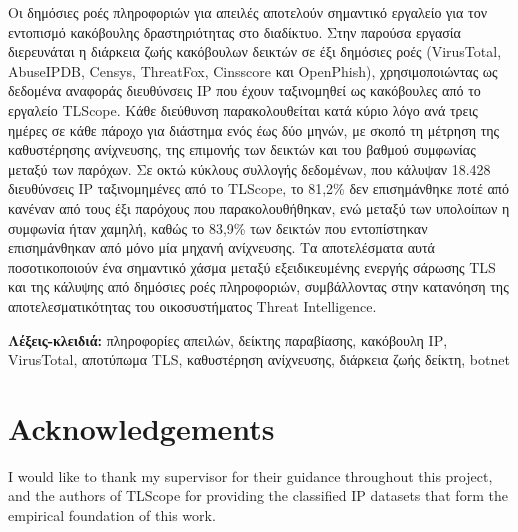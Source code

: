 \documentclass[12pt, a4paper, twoside]{report}
\begin{document}
Οι δημόσιες ροές πληροφοριών για απειλές αποτελούν σημαντικό εργαλείο για τον εντοπισμό
κακόβουλης δραστηριότητας στο διαδίκτυο. Στην παρούσα εργασία διερευνάται η διάρκεια ζωής
κακόβουλων δεικτών σε έξι δημόσιες ροές (\foreignlanguage{english}{VirusTotal},
\foreignlanguage{english}{AbuseIPDB}, \foreignlanguage{english}{Censys},
\foreignlanguage{english}{ThreatFox}, \foreignlanguage{english}{Cinsscore}
και \foreignlanguage{english}{OpenPhish}), χρησιμοποιώντας ως δεδομένα αναφοράς διευθύνσεις
\foreignlanguage{english}{IP} που έχουν ταξινομηθεί ως
κακόβουλες από το εργαλείο \foreignlanguage{english}{TLScope}. Κάθε διεύθυνση παρακολουθείται κατά κύριο λόγο ανά τρεις
ημέρες σε κάθε
πάροχο για διάστημα ενός έως δύο μηνών, με σκοπό τη μέτρηση της καθυστέρησης ανίχνευσης,
της επιμονής των δεικτών και του βαθμού συμφωνίας μεταξύ των παρόχων. Σε οκτώ κύκλους συλλογής
δεδομένων, που κάλυψαν 18.428 διευθύνσεις \foreignlanguage{english}{IP} ταξινομημένες από το
\foreignlanguage{english}{TLScope}, το 81,2\% δεν
επισημάνθηκε ποτέ από κανέναν από τους έξι παρόχους που παρακολουθήθηκαν, ενώ μεταξύ των
υπολοίπων η συμφωνία ήταν χαμηλή, καθώς το 83,9\% των δεικτών που εντοπίστηκαν επισημάνθηκαν από
μόνο μία μηχανή ανίχνευσης. Τα αποτελέσματα αυτά ποσοτικοποιούν ένα σημαντικό χάσμα μεταξύ
εξειδικευμένης ενεργής σάρωσης \foreignlanguage{english}{TLS} και της κάλυψης από δημόσιες ροές πληροφοριών, συμβάλλοντας
στην κατανόηση της αποτελεσματικότητας του οικοσυστήματος
\foreignlanguage{english}{Threat Intelligence}.

\bigskip\noindent
\textbf{Λέξεις-κλειδιά:} πληροφορίες απειλών, δείκτης παραβίασης, κακόβουλη
\foreignlanguage{english}{IP},
\foreignlanguage{english}{VirusTotal}, αποτύπωμα \foreignlanguage{english}{TLS}, καθυστέρηση ανίχνευσης, διάρκεια ζωής δείκτη,
\foreignlanguage{english}{botnet}

\cleardoublepage

\chapter*{Acknowledgements}

I would like to thank my supervisor for their guidance throughout this project,
and the authors of TLScope for providing the classified IP datasets that form the
empirical foundation of this work.

\cleardoublepage

\tableofcontents
\cleardoublepage
\end{document}
